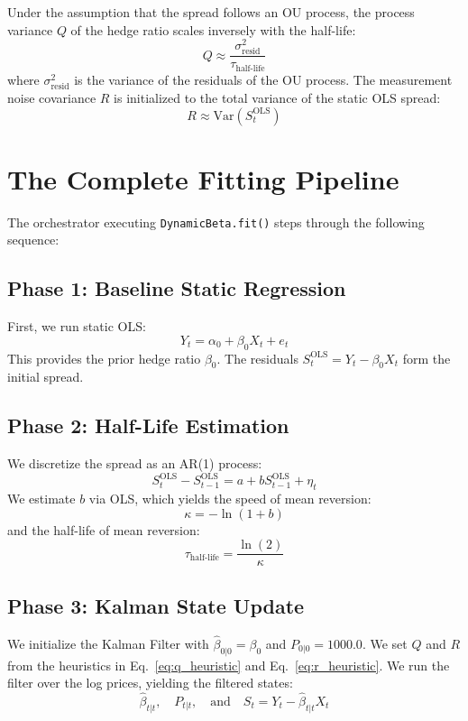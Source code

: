 \documentclass[10pt,a4paper,twocolumn]{article}
\newcommand{\tauhl}{\tau_{\text{half-life}}}
\begin{document}
\begin{tcolorbox}[mathbox={Q/R Noise Heuristics}]
Under the assumption that the spread follows an OU process, the process variance $Q$ of the hedge ratio scales inversely with the half-life:
\begin{equation}
  Q \approx \frac{\sigma_{\text{resid}}^2}{\tauhl}
  \label{eq:q_heuristic}
\end{equation}
where $\sigma_{\text{resid}}^2$ is the variance of the residuals of the OU process. The measurement noise covariance $R$ is initialized to the total variance of the static OLS spread:
\begin{equation}
  R \approx \text{Var}( S_t^{\text{OLS}} )
  \label{eq:r_heuristic}
\end{equation}
\end{tcolorbox}

\section{The Complete Fitting Pipeline}

The orchestrator executing \texttt{DynamicBeta.fit()} steps through the following sequence:

\subsection{Phase 1: Baseline Static Regression}
First, we run static OLS:
\[
  Y_t = \alpha_0 + \beta_0 X_t + e_t
\]
This provides the prior hedge ratio $\beta_0$. The residuals $S_t^{\text{OLS}} = Y_t - \beta_0 X_t$ form the initial spread.

\subsection{Phase 2: Half-Life Estimation}
We discretize the spread as an AR(1) process:
\[
  S_t^{\text{OLS}} - S_{t-1}^{\text{OLS}} = a + b S_{t-1}^{\text{OLS}} + \eta_t
\]
We estimate $b$ via OLS, which yields the speed of mean reversion:
\[
  \kappa = -\ln(1 + b)
\]
and the half-life of mean reversion:
\[
  \tauhl = \frac{\ln(2)}{\kappa}
\]

\subsection{Phase 3: Kalman State Update}
We initialize the Kalman Filter with $\hat{\beta}_{0|0} = \beta_0$ and $P_{0|0} = 1000.0$. We set $Q$ and $R$ from the heuristics in Eq.~\eqref{eq:q_heuristic} and Eq.~\eqref{eq:r_heuristic}. We run the filter over the log prices, yielding the filtered states:
\[
  \hat{\beta}_{t|t}, \quad P_{t|t}, \quad \text{and} \quad S_t = Y_t - \hat{\beta}_{t|t} X_t
\]
\end{document}

